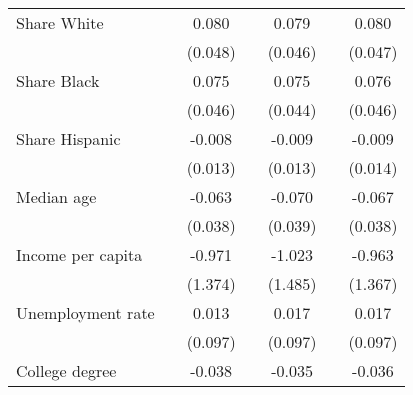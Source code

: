 {\begin{tabular}{l*{6}{c}}
\addlinespace
Share White         &                     &       0.080\sym{*}  &                     &       0.079\sym{*}  &                     &       0.080\sym{*}  \\
                    &                     &     (0.048)         &                     &     (0.046)         &                     &     (0.047)         \\
\addlinespace
Share Black         &                     &       0.075         &                     &       0.075\sym{*}  &                     &       0.076\sym{*}  \\
                    &                     &     (0.046)         &                     &     (0.044)         &                     &     (0.046)         \\
\addlinespace
Share Hispanic      &                     &      -0.008         &                     &      -0.009         &                     &      -0.009         \\
                    &                     &     (0.013)         &                     &     (0.013)         &                     &     (0.014)         \\
\addlinespace
Median age          &                     &      -0.063\sym{*}  &                     &      -0.070\sym{*}  &                     &      -0.067\sym{*}  \\
                    &                     &     (0.038)         &                     &     (0.039)         &                     &     (0.038)         \\
\addlinespace
Income per capita   &                     &      -0.971         &                     &      -1.023         &                     &      -0.963         \\
                    &                     &     (1.374)         &                     &     (1.485)         &                     &     (1.367)         \\
\addlinespace
Unemployment rate   &                     &       0.013         &                     &       0.017         &                     &       0.017         \\
                    &                     &     (0.097)         &                     &     (0.097)         &                     &     (0.097)         \\
\addlinespace
College degree      &                     &      -0.038\sym{*}  &                     &      -0.035         &                     &      -0.036\sym{*}  \\

\end{tabular}}
